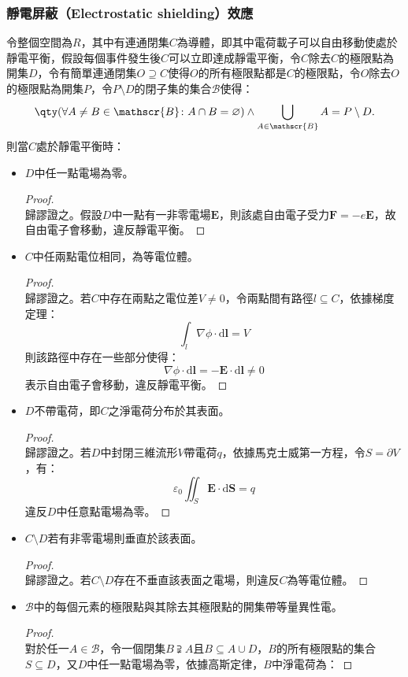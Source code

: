 \documentclass[a4paper,12pt]{report}
\begin{document}
\begin{itemize}
\subsubsection{靜電屏蔽（Electrostatic shielding）效應}
令整個空間為$R$，其中有連通閉集$C$為導體，即其中電荷載子可以自由移動使處於靜電平衡，假設每個事件發生後$C$可以立即達成靜電平衡，令$C$除去$C$的極限點為開集$D$，令有簡單連通閉集$O\supseteq C$使得$O$的所有極限點都是$C$的極限點，令$O$除去$O$的極限點為開集$P$，令$P\setminus D$的閉子集的集合$\mathscr{B}$使得：
\[\qty(\forall A\neq B\in\mathscr{B}\colon A\cap B=\varnothing)\land\bigcup_{A\in\mathscr{B}}A=P\setminus D.\]
則當$C$處於靜電平衡時：
\begin{itemize}
\item $D$中任一點電場為零。
\begin{proof}\mbox{}\\
歸謬證之。假設$D$中一點有一非零電場$\mathbf{E}$，則該處自由電子受力$\mathbf{F}=-e\mathbf{E}$，故自由電子會移動，違反靜電平衡。
\end{proof}
\item $C$中任兩點電位相同，為等電位體。
\begin{proof}\mbox{}\\
歸謬證之。若$C$中存在兩點之電位差$V\neq 0$，令兩點間有路徑$l\subseteq C$，依據梯度定理：
\[\int_{l}\nabla\phi\cdot\mathrm{d}\mathbf{l}=V\]
則該路徑中存在一些部分使得：
\[\nabla\phi\cdot\mathrm{d}\mathbf{l}=-\mathbf{E}\cdot\mathrm{d}\mathbf{l}\neq 0\]
表示自由電子會移動，違反靜電平衡。
\end{proof}
\item $D$不帶電荷，即$C$之淨電荷分布於其表面。
\begin{proof}\mbox{}\\
歸謬證之。若$D$中封閉三維流形$V$帶電荷$q$，依據馬克士威第一方程，令$S=\partial V$，有：
\[\varepsilon_0\iint_{S}\mathbf {E} \cdot \mathrm{d}\mathbf{S}=q\]
違反$D$中任意點電場為零。
\end{proof}
\item $C\setminus D$若有非零電場則垂直於該表面。
\begin{proof}\mbox{}\\
歸謬證之。若$C\setminus D$存在不垂直該表面之電場，則違反$C$為等電位體。
\end{proof}
\item $\mathscr{B}$中的每個元素的極限點與其除去其極限點的開集帶等量異性電。
\begin{proof}\mbox{}\\
對於任一$A\in\mathscr{B}$，令一個閉集$B\supsetneqq A$且$B\subseteq A\cup D$，$B$的所有極限點的集合$S\subseteq D$，又$D$中任一點電場為零，依據高斯定律，$B$中淨電荷為：

\end{proof}
\end{itemize}
\end{itemize}
\end{document}
